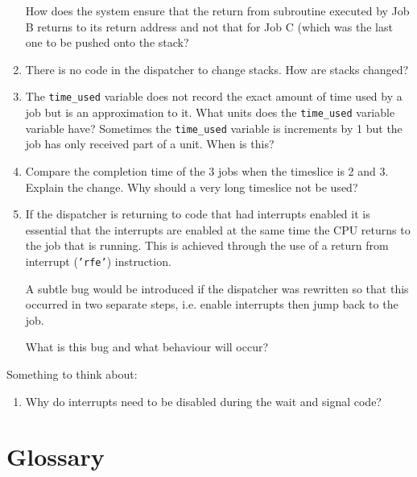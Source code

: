 \documentclass[a4paper,10pt]{article}
\begin{document}
\begin{enumerate}
How does the system ensure that the return from subroutine executed by
Job B returns to its return address and not that for Job C (which was
the last one to be pushed onto the stack?

\item
There is no code in the dispatcher to change stacks.  How are stacks
changed?


\item
The \texttt{time\_used} variable does not record the exact amount of
time used by a job but is an approximation to it.  What units does the
\texttt{time\_used} variable variable have?  Sometimes the
\texttt{time\_used} variable is increments by 1 but the job has only
received part of a unit.  When is this?


\item
Compare the completion time of the 3 jobs when the timeslice is 2 and
3. Explain the change.  Why should a very long timeslice not be used?

\item 
If the dispatcher is returning to code that had interrupts enabled it
is essential that the interrupts are enabled at the same time the CPU
returns to the job that is running.  This is achieved through the use
of a return from interrupt (\texttt{'rfe'}) instruction.

A subtle bug would be introduced if the dispatcher was rewritten so
that this occurred in two separate steps, i.e. enable interrupts then
jump back to the job.  

What is this bug and what behaviour will occur? 
\end{enumerate}

Something to think about:

\begin{enumerate}
\item
Why do interrupts need to be disabled during the wait and signal code?
\end{enumerate}


%

\section{Glossary}
\end{document}
